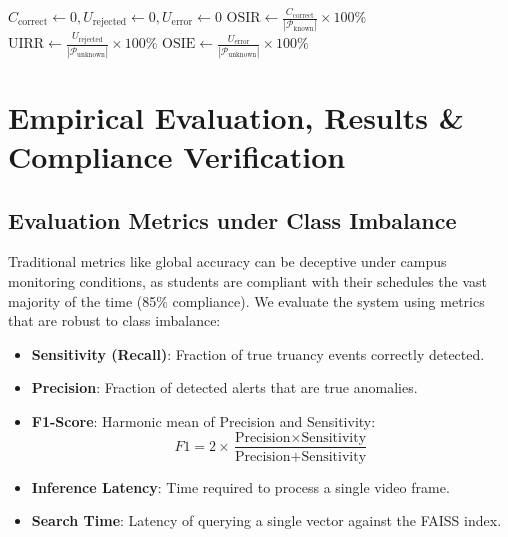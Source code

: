 \documentclass[12pt,a4paper,oneside]{report}
\begin{document}
\begin{algorithm}[H]
\caption{Open-Set Metric Evaluation Protocol (OSIR, UIRR, OSIE)}

$C_{\text{correct}} \leftarrow 0, U_{\text{rejected}} \leftarrow 0, U_{\text{error}} \leftarrow 0$\;
$\text{OSIR} \leftarrow \frac{C_{\text{correct}}}{|\mathcal{P}_{\text{known}}|} \times 100\%$\;
$\text{UIRR} \leftarrow \frac{U_{\text{rejected}}}{|\mathcal{P}_{\text{unknown}}|} \times 100\%$\;
$\text{OSIE} \leftarrow \frac{U_{\text{error}}}{|\mathcal{P}_{\text{unknown}}|} \times 100\%$\;
\;
\end{algorithm}

\chapter{Empirical Evaluation, Results \& Compliance Verification}
\thispagestyle{empty}

\section{Evaluation Metrics under Class Imbalance}
Traditional metrics like global accuracy can be deceptive under campus monitoring conditions, as students are compliant with their schedules the vast majority of the time (85\% compliance). We evaluate the system using metrics that are robust to class imbalance:
\begin{itemize}
    \item \textbf{Sensitivity (Recall)}: Fraction of true truancy events correctly detected.
    \item \textbf{Precision}: Fraction of detected alerts that are true anomalies.
    \item \textbf{F1-Score}: Harmonic mean of Precision and Sensitivity:
    \begin{equation}
        F1 = 2 \times \frac{\text{Precision} \times \text{Sensitivity}}{\text{Precision} + \text{Sensitivity}}
    \end{equation}
    \item \textbf{Inference Latency}: Time required to process a single video frame.
    \item \textbf{Search Time}: Latency of querying a single vector against the FAISS index.
\end{itemize}
\end{document}
